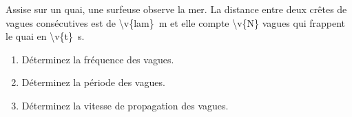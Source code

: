 Assise sur un quai, une surfeuse observe la mer. La distance entre deux crêtes de vagues consécutives est de \qty{\v{lam}}{m} et elle compte \num{\v{N}} vagues qui frappent le quai en \qty{\v{t}}{s}.

\begin{enumerate}[label=\alph*)]
    \item Déterminez la fréquence des vagues.
    \item Déterminez la période des vagues.
    \item Déterminez la vitesse de propagation des vagues.
\end{enumerate}
